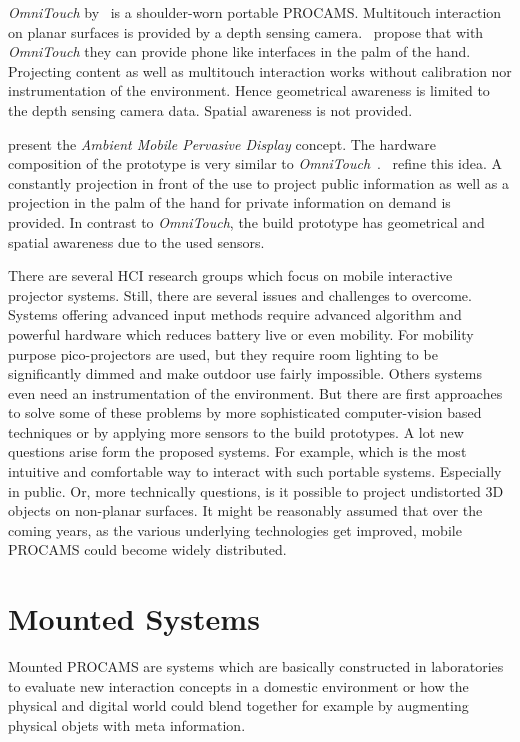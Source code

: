 \textit{OmniTouch} by~\textcite{Harrison:2011bn} is a shoulder-worn portable \ac{PROCAMS}. Multitouch interaction on planar surfaces is provided by a depth sensing camera.~\citeauthor{Harrison:2011bn} propose that with \textit{OmniTouch} they can provide phone like interfaces in the palm of the hand. Projecting content as well as multitouch interaction works without calibration nor instrumentation of the environment. Hence geometrical awareness is limited to the depth sensing camera data. Spatial awareness is not provided.

\textcite{Winkler:2014wp} present the \textit{Ambient Mobile Pervasive Display} concept. The hardware composition of the prototype is very similar to \textit{OmniTouch}~\cite{Harrison:2011bn}.~\citeauthor{Winkler:2014wp} refine this idea. A constantly projection in front of the use to project public information as well as a projection in the palm of the hand for private information on demand is provided. In contrast to \textit{OmniTouch}, the build prototype has geometrical and spatial awareness due to the used sensors. 


There are several HCI research groups which focus on mobile interactive projector systems. Still, there are several issues and challenges to overcome. Systems offering advanced input methods require advanced algorithm and powerful hardware which reduces battery live or even mobility. For mobility purpose pico-projectors are used, but they require room lighting to be significantly dimmed and make outdoor use fairly impossible. Others systems even need an instrumentation of the environment. 
But there are first approaches to solve some of these problems by more sophisticated computer-vision based techniques or by applying more sensors to the build prototypes. 
A lot new questions arise form the proposed systems. For example, which is the most intuitive and comfortable way to interact with such portable systems. Especially in public. Or, more technically questions, is it possible to project undistorted 3D objects on non-planar surfaces. It might be reasonably assumed that over the coming years, as the various underlying technologies get improved, mobile \ac{PROCAMS} could become widely distributed.


\section{Mounted Systems}
Mounted PROCAMS are systems which are basically constructed in laboratories to evaluate new interaction concepts in a domestic environment or how the physical and digital world could blend together for example by augmenting physical objets with meta information. 

